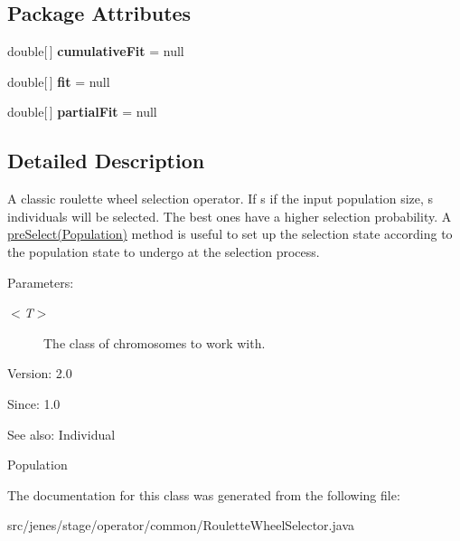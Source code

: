 \subsection*{Package Attributes}
\begin{CompactItemize}
\item 
\hypertarget{classjenes_1_1stage_1_1operator_1_1common_1_1_roulette_wheel_selector_3_01_t_01extends_01_chromosome_01_4_c030f795440f2d69c4e08f80219cda30}{
double\mbox{[}$\,$\mbox{]} \textbf{cumulativeFit} = null}
\label{classjenes_1_1stage_1_1operator_1_1common_1_1_roulette_wheel_selector_3_01_t_01extends_01_chromosome_01_4_c030f795440f2d69c4e08f80219cda30}

\item 
\hypertarget{classjenes_1_1stage_1_1operator_1_1common_1_1_roulette_wheel_selector_3_01_t_01extends_01_chromosome_01_4_f64e3d25c886903470c3e188b287af4c}{
double\mbox{[}$\,$\mbox{]} \textbf{fit} = null}
\label{classjenes_1_1stage_1_1operator_1_1common_1_1_roulette_wheel_selector_3_01_t_01extends_01_chromosome_01_4_f64e3d25c886903470c3e188b287af4c}

\item 
\hypertarget{classjenes_1_1stage_1_1operator_1_1common_1_1_roulette_wheel_selector_3_01_t_01extends_01_chromosome_01_4_c073a280077bd972cab00cd2608ae415}{
double\mbox{[}$\,$\mbox{]} \textbf{partialFit} = null}
\label{classjenes_1_1stage_1_1operator_1_1common_1_1_roulette_wheel_selector_3_01_t_01extends_01_chromosome_01_4_c073a280077bd972cab00cd2608ae415}

\end{CompactItemize}


\subsection{Detailed Description}
A classic roulette wheel selection operator. If s if the input population size, s individuals will be selected. The best ones have a higher selection probability. A \hyperlink{}{preSelect(Population)} method is useful to set up the selection state according to the population state to undergo at the selection process. 

\begin{Desc}
\item[Parameters:]
\begin{description}
\item[{\em $<$T$>$}]The class of chromosomes to work with.\end{description}
\end{Desc}
\begin{Desc}
\item[Version:]2.0 \end{Desc}
\begin{Desc}
\item[Since:]1.0\end{Desc}
\begin{Desc}
\item[See also:]Individual 

Population \end{Desc}


The documentation for this class was generated from the following file:\begin{CompactItemize}
\item 
src/jenes/stage/operator/common/RouletteWheelSelector.java\end{CompactItemize}
